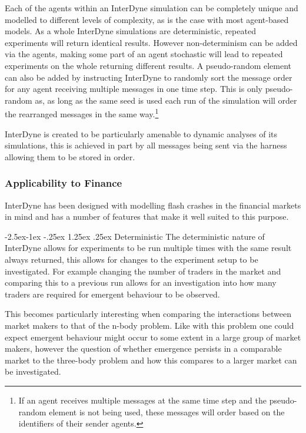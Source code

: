 \documentclass{article}
\makeatletter
\renewcommand\paragraph{\@startsection{paragraph}{4}{\z@}%
	{-2.5ex\@plus -1ex \@minus -.25ex}%
	{1.25ex \@plus .25ex}%
	{\normalfont\normalsize\bfseries}}
\makeatother
\begin{document}
Each of the agents within an InterDyne simulation can be completely unique and modelled to different levels of complexity, as is the case with most agent-based models. As a whole InterDyne simulations are deterministic, repeated experiments will return identical results. However non-determinism can be added via the agents, making some part of an agent stochastic will lead to repeated experiments on the whole returning different results. A pseudo-random element can also be added by instructing InterDyne to randomly sort the message order for any agent receiving multiple messages in one time step. This is only pseudo-random as, as long as the same seed is used each run of the simulation will order the rearranged messages in the same way.\footnote{If an agent receives multiple messages at the same time step and the pseudo-random element is not being used, these messages will order based on the identifiers of their sender agents.}

InterDyne is created to be particularly amenable to dynamic analyses of its simulations, this is achieved in part by all messages being sent via the harness allowing them to be stored in order.     


\subsubsection{Applicability to Finance} \label{applicabilut_to_finance}
InterDyne has been designed with modelling flash crashes in the financial markets in mind and has a number of features that make it well suited to this purpose. 

\paragraph{Deterministic}
The deterministic nature of InterDyne allows for experiments to be run multiple times with the same result always returned, this allows for changes to the experiment setup to be investigated. For example changing the number of traders in the market and comparing this to a previous run allows for an investigation into how many traders are required for emergent behaviour to be observed.

This becomes particularly interesting when comparing the interactions between market makers to that of the n-body problem. Like with this problem one could expect emergent behaviour might occur to some extent in a large group of market makers, however the question of whether emergence persists in a comparable market to the three-body problem and how this compares to a larger market can be investigated.   
\end{document}
